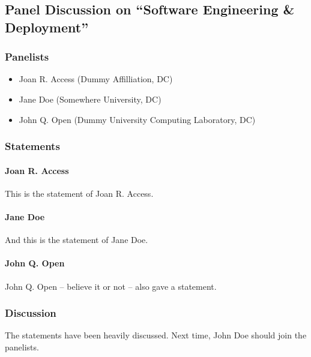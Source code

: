 \subsection{Panel Discussion on ``Software Engineering \& Deployment''}

\subsubsection{Panelists}

\begin{itemize}
\item Joan R. Access (Dummy Affilliation, DC)
\item Jane Doe (Somewhere University, DC)
\item John Q. Open (Dummy University Computing Laboratory, DC)
\end{itemize}

\subsubsection{Statements}

\paragraph{Joan R. Access}

This is the statement of Joan R. Access.

\paragraph{Jane Doe}

And this is the statement of Jane Doe.

\paragraph{John Q. Open}

John Q. Open -- believe it or not -- also gave a statement.

\subsubsection{Discussion}

The statements have been heavily discussed. Next time, John Doe should join the panelists.

